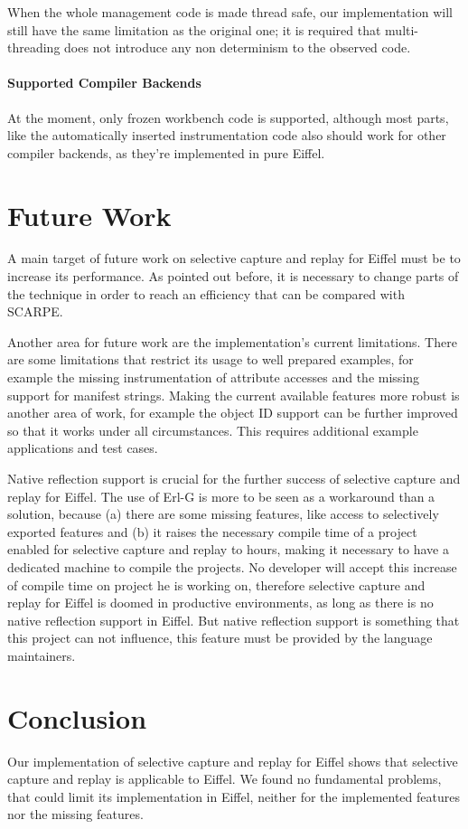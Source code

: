 When the whole management code is made thread safe, our implementation will still have the same limitation as the original one; it is required that multi-threading does not introduce any non determinism to the observed code.

\paragraph{Supported Compiler Backends}
At the moment, only frozen workbench code is supported, although most parts, like the automatically inserted instrumentation code also should work for other compiler backends, as they're implemented in pure Eiffel.


\section{Future Work}
A main target of future work on selective capture and replay for Eiffel must be to increase its performance. As pointed out before, it is necessary to change parts of the technique in order to reach an efficiency that can be compared with SCARPE.

Another area for future work are the implementation's current limitations. There are some limitations that restrict its usage to well prepared examples, for example the missing instrumentation of attribute accesses and the missing support for manifest strings. Making the current available features more robust is another area of work, for example the object ID support can be further improved so that it works under all circumstances. This requires additional example applications and test cases.

Native reflection support is crucial for the further success of selective capture and replay for Eiffel. The use of Erl-G is more to be seen as a workaround than a solution, because (a) there are some missing features, like access to selectively exported features and (b) it raises the necessary compile time of a project enabled for selective capture and replay to hours, making it necessary to have a dedicated machine to compile the projects. No developer will accept this increase of compile time on project he is working on, therefore selective capture and replay for Eiffel is doomed in productive environments, as long as there is no native reflection support in Eiffel. But native reflection support is something that this project can not influence, this feature must be provided by the language maintainers.


\section{Conclusion}
Our implementation of selective capture and replay for Eiffel shows that selective capture and replay is applicable to Eiffel. We found no fundamental problems, that could limit its implementation in Eiffel, neither for the implemented features nor the missing features.

